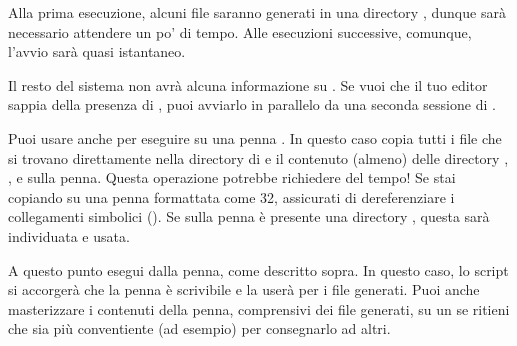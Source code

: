 \documentclass{article}
\begin{document}
Alla prima esecuzione, alcuni file saranno generati in una directory
, dunque sarà necessario attendere un po' di
tempo. Alle esecuzioni successive, comunque, l'avvio sarà quasi
istantaneo.

Il resto del sistema non avrà alcuna informazione su \TL. Se vuoi che il
tuo editor sappia della presenza di \TL, puoi avviarlo in parallelo da una
seconda sessione di . 

Puoi usare  anche per eseguire \TL{} su una penna
. In questo caso copia tutti i file che si trovano direttamente
nella directory di \TL{} e il contenuto (almeno) delle directory
, ,  e 
sulla penna. Questa operazione potrebbe richiedere del tempo! Se stai
copiando su una penna  formattata come 32, assicurati
di dereferenziare i collegamenti simbolici (). Se sulla penna
è presente una directory , questa sarà individuata e
usata.

A questo punto esegui  dalla penna, come descritto
sopra. In questo caso, lo script si accorgerà che la penna è scrivibile e
la userà per i file generati. Puoi anche masterizzare i contenuti della
penna, comprensivi dei file generati, su un \DVD{} se ritieni che sia più
conventiente (ad esempio) per consegnarlo ad altri.
\end{document}

